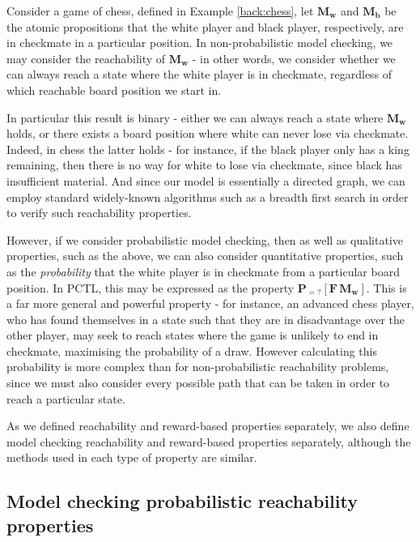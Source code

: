 \begin{example}
\label{back:chess-reachability}
    Consider a game of chess, defined in Example \ref{back:chess}, let $\mathbf{M_w}$ and $\mathbf{M_b}$ be the atomic propositions that the white player and black player, respectively, are in checkmate in a particular position. In non-probabilistic model checking, we may consider the reachability of $\mathbf{M_w}$ - in other words, we consider whether we can always reach a state where the white player is in checkmate, regardless of which reachable board position we start in.
    
    In particular this result is binary - either we can always reach a state where $\mathbf{M_w}$ holds, or there exists a board position where white can never lose via checkmate. Indeed, in chess the latter holds - for instance, if the black player only has a king remaining, then there is no way for white to lose via checkmate, since black has insufficient material. And since our model is essentially a directed graph, we can employ standard widely-known algorithms such as a breadth first search in order to verify such reachability properties.

    However, if we consider probabilistic model checking, then as well as qualitative properties, such as the above, we can also consider quantitative properties, such as the \emph{probability} that the white player is in checkmate from a particular board position. In PCTL, this may be expressed as the property $\mathbf{P}_{=?} [\mathbf{F} \, \mathbf{M_w}]$. This is a far more general and powerful property - for instance, an advanced chess player, who has found themselves in a state such that they are in disadvantage over the other player, may seek to reach states where the game is unlikely to end in checkmate, maximising the probability of a draw. However calculating this probability is more complex than for non-probabilistic reachability problems, since we must also consider every possible path that can be taken in order to reach a particular state.
\end{example}

As we defined reachability and reward-based properties separately, we also define model checking reachability and reward-based properties separately, although the methods used in each type of property are similar.

\subsection{Model checking probabilistic reachability properties}
\label{back:check-reach}

